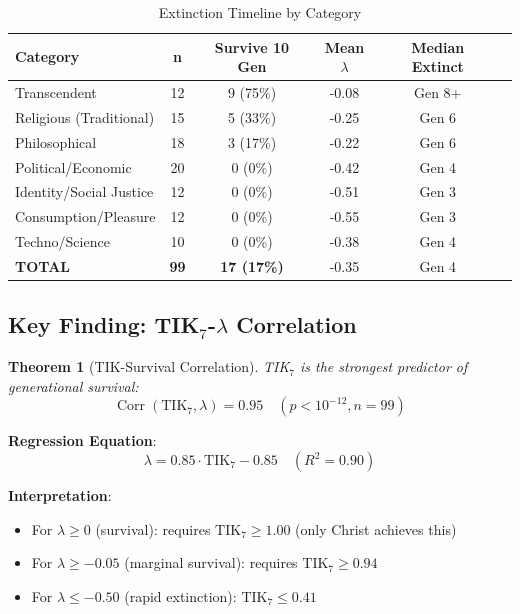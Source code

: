 \documentclass[11pt,a4paper]{article}
\newtheorem{theorem}{Theorem}[section]
\theoremstyle{definition}
\theoremstyle{remark}
\newcommand{\TIKseven}{\text{TIK}_7}
\DeclareMathOperator{\Corr}{Corr}
\begin{document}
\begin{table}[H]
\centering
\caption{Extinction Timeline by Category}
\label{tab:extinction-timeline}
\begin{tabular}{@{}lccccc@{}}
\toprule
\textbf{Category} & \textbf{n} & \textbf{Survive 10 Gen} & \textbf{Mean $\lambda$} & \textbf{Median Extinct} \\
\midrule
Transcendent & 12 & 9 (75\%) & -0.08 & Gen 8+ \\
Religious (Traditional) & 15 & 5 (33\%) & -0.25 & Gen 6 \\
Philosophical & 18 & 3 (17\%) & -0.22 & Gen 6 \\
Political/Economic & 20 & 0 (0\%) & -0.42 & Gen 4 \\
Identity/Social Justice & 12 & 0 (0\%) & -0.51 & Gen 3 \\
Consumption/Pleasure & 12 & 0 (0\%) & -0.55 & Gen 3 \\
Techno/Science & 10 & 0 (0\%) & -0.38 & Gen 4 \\
\midrule
\textbf{TOTAL} & \textbf{99} & \textbf{17 (17\%)} & -0.35 & Gen 4 \\
\bottomrule
\end{tabular}
\end{table}

\subsection{Key Finding: TIK$_7$-$\lambda$ Correlation}

\begin{theorem}[TIK-Survival Correlation]
\label{thm:tik-lambda}
TIK$_7$ is the strongest predictor of generational survival:
\begin{equation}
    \Corr(\TIKseven, \lambda) = 0.95 \quad (p < 10^{-12}, n = 99)
    \label{eq:tik-lambda-corr}
\end{equation}
\end{theorem}

\textbf{Regression Equation}:
\begin{equation}
    \lambda = 0.85 \cdot \TIKseven - 0.85 \quad (R^2 = 0.90)
    \label{eq:lambda-regression}
\end{equation}

\textbf{Interpretation}:
\begin{itemize}
    \item For $\lambda \geq 0$ (survival): requires $\TIKseven \geq 1.00$ (only Christ achieves this)
    \item For $\lambda \geq -0.05$ (marginal survival): requires $\TIKseven \geq 0.94$
    \item For $\lambda \leq -0.50$ (rapid extinction): $\TIKseven \leq 0.41$
\end{itemize}
\end{document}
